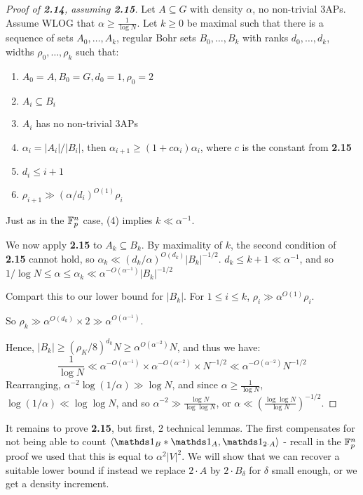 \documentclass[10pt,a4paper]{article}
\begin{document}
\begin{proof}[Proof of \textbf{2.14}, assuming \textbf{2.15}]
  Let $A \subseteq G$ with density $\alpha$, no non-trivial 3APs. Assume WLOG that $\alpha \geq \frac{1}{\log N}$. Let $k \geq 0$ be maximal such that there is a sequence of sets $A_0, \ldots, A_k$, regular Bohr sets $B_0, \ldots, B_k$ with ranks $d_0, \ldots, d_k$, widths $\rho_0, \ldots, \rho_k$ such that:
  \begin{enumerate}
    \item $A_0 = A, B_0 = G, d_0 = 1, \rho_0 = 2$
    \item $A_i \subseteq B_i$
    \item $A_i$ has no non-trivial 3APs
    \item $\alpha_i = |A_i|/|B_i|$, then $\alpha_{i+1} \geq (1+c\alpha_i)\alpha_i$, where $c$ is the constant from \textbf{2.15}
    \item $d_i \leq i+1$
    \item $\rho_{i+1} \gg (\alpha/d_i)^{O(1)}\rho_i$
  \end{enumerate}
  Just as in the $\mathbb{F}_p^n$ case, (4) implies $k \ll \alpha^{-1}$.

  We now apply \textbf{2.15} to $A_k \subseteq B_k$. By maximality of $k$, the second condition of \textbf{2.15} cannot hold, so $\alpha_k \ll (d_k/\alpha)^{O(d_k)}|B_k|^{-1/2}$. $d_k \leq k+1 \ll \alpha^{-1}$, and so $1/\log N \leq \alpha \leq \alpha_k \ll \alpha^{-O(\alpha^{-1})}|B_k|^{-1/2}$

  Compart this to our lower bound for $|B_k|$. For $1 \leq i \leq k$, $\rho_i \gg \alpha^{O(1)} \rho_i$.

  So $\rho_k \gg \alpha^{O(d_k)}\times 2 \gg \alpha^{O(\alpha^{-1})}$.

  Hence, $|B_k| \geq (\rho_K/8)^{d_k}N \geq \alpha^{O(\alpha^{-2})}N$, and thus we have:
  \[\frac{1}{\log N} \ll \alpha^{-O(\alpha^{-1})} \times \alpha^{-O(\alpha^{-2})} \times N^{-1/2} \ll \alpha^{-O(\alpha^{-2})}N^{-1/2}\]
  Rearranging, $\alpha^{-2}\log(1/\alpha) \gg \log N$, and since $\alpha \geq \frac{1}{\log N}$, $\log(1/\alpha) \ll \log\log N$, and so $\alpha^{-2} \gg \frac{\log N}{\log\log N}$, or $\alpha \ll \left(\frac{\log\log N}{\log N}\right)^{-1/2}$.
\end{proof}
It remains to prove \textbf{2.15}, but first, 2 technical lemmas. The first compensates for not being able to count $\angle{\one_B \ast \one_A, \one_{2\cdot A}}$ - recall in the $\mathbb{F}_p^n$ proof we used that this is equal to $\alpha^2 |V|^2$. We will show that we can recover a suitable lower bound if instead we replace $2\cdot A$ by $2 \cdot B_{\delta}$ for $\delta$ small enough, or we get a density increment.
\end{document}
